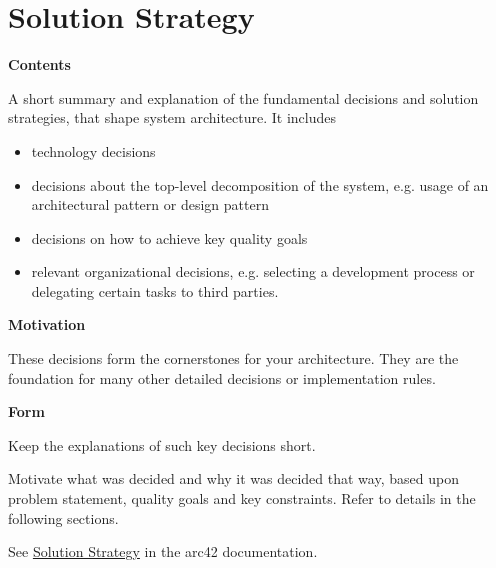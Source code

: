 \hypertarget{section-solution-strategy}{%
\section{Solution Strategy}\label{section-solution-strategy}}

\textbf{Contents}

A short summary and explanation of the fundamental decisions and
solution strategies, that shape system architecture. It includes

\begin{itemize}
\item
  technology decisions
\item
  decisions about the top-level decomposition of the system, e.g. usage
  of an architectural pattern or design pattern
\item
  decisions on how to achieve key quality goals
\item
  relevant organizational decisions, e.g. selecting a development
  process or delegating certain tasks to third parties.
\end{itemize}

\textbf{Motivation}

These decisions form the cornerstones for your architecture. They are
the foundation for many other detailed decisions or implementation
rules.

\textbf{Form}

Keep the explanations of such key decisions short.

Motivate what was decided and why it was decided that way, based upon
problem statement, quality goals and key constraints. Refer to details
in the following sections.

See \href{https://docs.arc42.org/section-4/}{Solution Strategy} in the
arc42 documentation.

